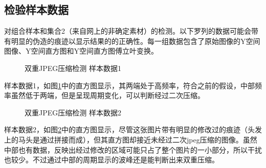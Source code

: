 \documentclass[a4paper, 10pt, notitlepage]{report}
\begin{document}
		\subsection{检验样本数据}

			对组合样本和集合2（来自网上的非确定素材）的检测。以下罗列的数据可能会带有明显的伪造的痕迹以显示结果的的正确性。每一组数据包含了原始图像的Y空间图像、Y空间直方图和Y空间直方图傅立叶变换。

			\begin{figure}[ht]
				\centering
				\begin{minipage}[t]{.49\textwidth}
				\par\vspace{0pt}
				\end{minipage}
				\begin{minipage}[t]{.5\textwidth}
				\par\vspace{0pt}
				\end{minipage}
				\caption{双重JPEG压缩检测 样本数据1 }
				\label{fig-sample1}
			\end{figure}
			样本数据1，如图\ref{fig-sample1}中的直方图显示，其两端处于高频率，符合之前的假设，中部频率虽然低于两端，但是呈现周期变化，可以判断经过二次压缩。

			\begin{figure}[ht]
				\centering
				\begin{minipage}[t]{.49\textwidth}
				\par\vspace{0pt}
				\end{minipage}
				\begin{minipage}[t]{.5\textwidth}
				\par\vspace{0pt}
				\end{minipage}
				\caption{双重JPEG压缩检测 样本数据2 }
				\label{fig-sample2}
			\end{figure}
			样本数据2，如图\ref{fig-sample2}中的直方图显示，尽管这张图片带有明显的修改过的痕迹（头发上的马头是通过拼接而成），但其直方图却接近未经过二次jpeg压缩的图像。虽然中部也有数据，反映出经过修改的区域可能只占了整个图片的一小部分，所以干扰也较少。不过通过中部的周期显示的波峰还是能判断出来双重压缩。
\end{document}
